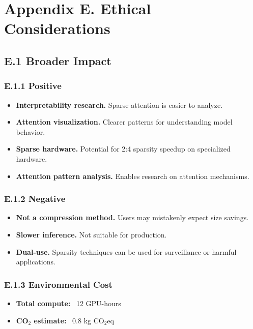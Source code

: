 
\section{Appendix E. Ethical Considerations}

\subsection{E.1 Broader Impact}

\subsubsection{E.1.1 Positive}

\begin{itemize}
\item \textbf{Interpretability research.} Sparse attention is easier to analyze.
\item \textbf{Attention visualization.} Clearer patterns for understanding model behavior.
\item \textbf{Sparse hardware.} Potential for 2:4 sparsity speedup on specialized hardware.
\item \textbf{Attention pattern analysis.} Enables research on attention mechanisms.

\end{itemize}
\subsubsection{E.1.2 Negative}

\begin{itemize}
\item \textbf{Not a compression method.} Users may mistakenly expect size savings.
\item \textbf{Slower inference.} Not suitable for production.
\item \textbf{Dual-use.} Sparsity techniques can be used for surveillance or harmful
  applications.

\end{itemize}
\subsubsection{E.1.3 Environmental Cost}

\begin{itemize}
\item \textbf{Total compute:} ~12 GPU-hours
\item \textbf{CO$_2$ estimate:} ~0.8 kg CO$_2$eq

\end{itemize}
